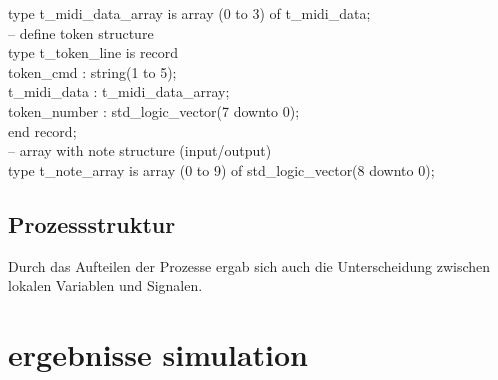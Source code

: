 \smallskip
type t\_midi\_data\_array is array (0 to 3) of t\_midi\_data;\\

-- define token structure\\
type t\_token\_line is record\\
\hspace*{12mm}        token\_cmd : string(1 to 5);\\
\hspace*{12mm}        t\_midi\_data : t\_midi\_data\_array;\\
\hspace*{12mm}        token\_number : std\_logic\_vector(7 downto 0);\\
\hspace*{12mm}    end record;\\


        
-- array with note structure (input/output)     \\
type t\_note\_array is array (0 to 9) of std\_logic\_vector(8 downto 0);\\

\subsection*{Prozessstruktur}

Durch das Aufteilen der Prozesse ergab sich auch die Unterscheidung zwischen lokalen Variablen und Signalen.

\section{ergebnisse simulation}\label{sec.ergebnisse_tests}


